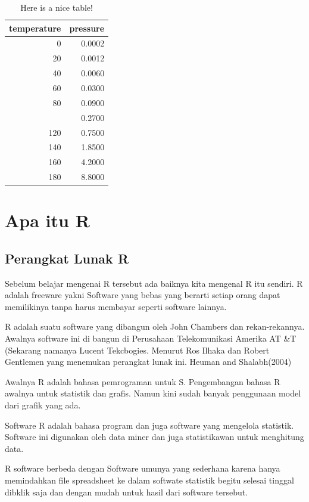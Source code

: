 \documentclass[
]{book}
\theoremstyle{definition}
\theoremstyle{definition}
\theoremstyle{definition}
\theoremstyle{definition}
\theoremstyle{remark}
\begin{document}
\begin{table}

\caption{\label{tab:nice-tab}Here is a nice table!}
\centering
\begin{tabular}[t]{rr}
\toprule
temperature & pressure\\
\midrule
0 & 0.0002\\
20 & 0.0012\\
40 & 0.0060\\
60 & 0.0300\\
80 & 0.0900\\
\addlinespace
100 & 0.2700\\
120 & 0.7500\\
140 & 1.8500\\
160 & 4.2000\\
180 & 8.8000\\
\bottomrule
\end{tabular}
\end{table}

\hypertarget{apa-itu-r}{%
\chapter{Apa itu R}\label{apa-itu-r}}

\hypertarget{perangkat-lunak-r}{%
\section{Perangkat Lunak R}\label{perangkat-lunak-r}}

Sebelum belajar mengenai R tersebut ada baiknya kita mengenal R itu sendiri. R adalah freeware yakni Software yang bebas yang berarti setiap orang dapat memilikinya tanpa harus membayar seperti software lainnya.

R adalah suatu software yang dibangun oleh John Chambers dan rekan-rekannya. Awalnya software ini di bangun di Perusahaan Telekomunikasi Amerika AT \&T (Sekarang namanya Lucent Tekcbogies. Menurut Ros Ilhaka dan Robert Gentlemen yang menemukan perangkat lunak ini. Heuman and Shalabh(2004)

Awalnya R adalah bahasa pemrograman untuk S. Pengembangan bahasa R awalnya untuk statistik dan grafis. Namun kini sudah banyak penggunaan model dari grafik yang ada.

Software R adalah bahasa program dan juga software yang mengelola statistik. Software ini digunakan oleh data miner dan juga statistikawan untuk menghitung data.

R software berbeda dengan Software umunya yang sederhana karena hanya memindahkan file spreadsheet ke dalam softwate statistik begitu selesai tinggal dibklik saja dan dengan mudah untuk hasil dari software tersebut.
\end{document}
